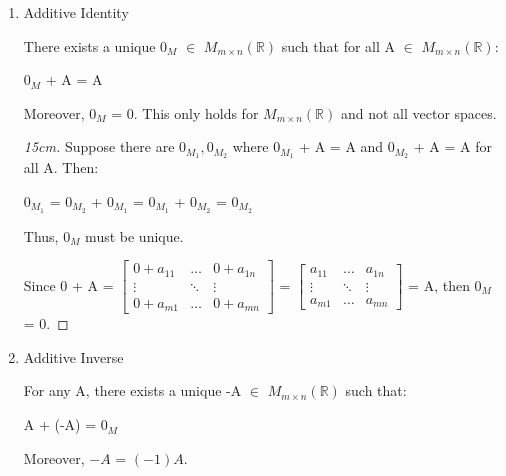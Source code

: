 \begin{enumerate}[label=(\alph*), leftmargin=2cm, itemsep=0.1cm]
        \item {\color{lgreen} Additive Identity}
        
            There exists a unique $0_M$ $\in$ $M_{m \times n}(\mathbb{R})$
            such that for all A $\in$ $M_{m \times n}(\mathbb{R})$:

            \hspace{0.5cm}
            $0_M$ + A = A

            Moreover, $0_M$ = 0.
            This only holds for $M_{m \times n}(\mathbb{R})$
            and not all vector spaces.

            \begin{proof}[15cm]
                Suppose there are $0_{M_1},0_{M_2}$ where
                $0_{M_1}$ + A = A and $0_{M_2}$ + A = A for all A. Then:

                \hspace{0.5cm}
                $0_{M_1}$
                = $0_{M_2}$ + $0_{M_1}$
                = $0_{M_1}$ + $0_{M_2}$
                = $0_{M_2}$

                Thus, $0_M$ must be unique.

                Since
                0 + A =
                $\begin{bmatrix}
                    0+a_{11} & \hdots & 0+a_{1n} \\
                    \vdots  & \ddots & \vdots \\
                    0+a_{m1} & \hdots & 0+a_{mn}
                \end{bmatrix}$ =
                $\begin{bmatrix}
                    a_{11} & \hdots & a_{1n} \\
                    \vdots  & \ddots & \vdots \\
                    a_{m1} & \hdots & a_{mn}
                \end{bmatrix}$
                = A, then $0_M$ = 0.
            \end{proof}

        \item {\color{lgreen} Additive Inverse}
        
            For any A, there exists a unique -A $\in$ $M_{m \times n}(\mathbb{R})$
            such that:

            \hspace{0.5cm}
            A + (-A) = $0_M$

            Moreover, $-A$ = $(-1)A$.


\end{enumerate}
